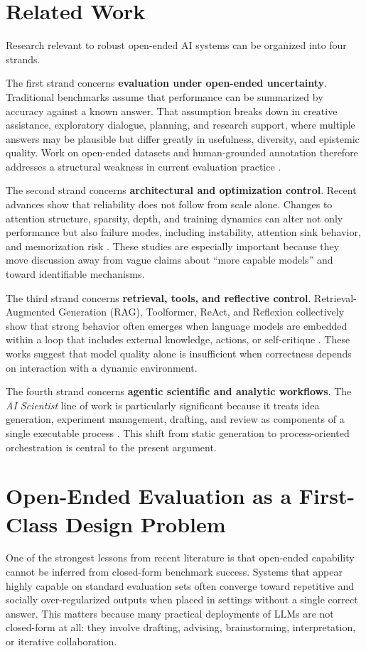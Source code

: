 \documentclass[10pt,twocolumn]{article}
\begin{document}
\section{Related Work}
Research relevant to robust open-ended AI systems can be organized into four strands.

The first strand concerns \textbf{evaluation under open-ended uncertainty}. Traditional benchmarks assume that performance can be summarized by accuracy against a known answer. That assumption breaks down in creative assistance, exploratory dialogue, planning, and research support, where multiple answers may be plausible but differ greatly in usefulness, diversity, and epistemic quality. Work on open-ended datasets and human-grounded annotation therefore addresses a structural weakness in current evaluation practice \citep{hivemind2025}.

The second strand concerns \textbf{architectural and optimization control}. Recent advances show that reliability does not follow from scale alone. Changes to attention structure, sparsity, depth, and training dynamics can alter not only performance but also failure modes, including instability, attention sink behavior, and memorization risk \citep{gated2025,wang2025rl,diffusion2025}. These studies are especially important because they move discussion away from vague claims about ``more capable models'' and toward identifiable mechanisms.

The third strand concerns \textbf{retrieval, tools, and reflective control}. Retrieval-Augmented Generation (RAG), Toolformer, ReAct, and Reflexion collectively show that strong behavior often emerges when language models are embedded within a loop that includes external knowledge, actions, or self-critique \citep{lewis2020rag,schick2023toolformer,yao2023react,shinn2023reflexion}. These works suggest that model quality alone is insufficient when correctness depends on interaction with a dynamic environment.

The fourth strand concerns \textbf{agentic scientific and analytic workflows}. The \emph{AI Scientist} line of work is particularly significant because it treats idea generation, experiment management, drafting, and review as components of a single executable process \citep{aiscientist2024,aiscientistv2_2025}. This shift from static generation to process-oriented orchestration is central to the present argument.

\section{Open-Ended Evaluation as a First-Class Design Problem}
One of the strongest lessons from recent literature is that open-ended capability cannot be inferred from closed-form benchmark success. Systems that appear highly capable on standard evaluation sets often converge toward repetitive and socially over-regularized outputs when placed in settings without a single correct answer. This matters because many practical deployments of LLMs are not closed-form at all: they involve drafting, advising, brainstorming, interpretation, or iterative collaboration.
\end{document}
